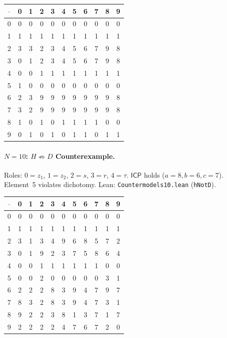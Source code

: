\documentclass[sigconf,screen]{acmart}
\newcommand{\dotop}{\cdot}
\newcommand{\ICP}{\textsf{ICP}}
\theoremstyle{remark}
\begin{document}
\medskip
{\footnotesize
\begin{tabular}{c|cccccccccc}
$\dotop$ & 0 & 1 & 2 & 3 & 4 & 5 & 6 & 7 & 8 & 9 \\\hline
0 & 0 & 0 & 0 & 0 & 0 & 0 & 0 & 0 & 0 & 0 \\
1 & 1 & 1 & 1 & 1 & 1 & 1 & 1 & 1 & 1 & 1 \\
2 & 3 & 3 & 2 & 3 & 4 & 5 & 6 & 7 & 9 & 8 \\
3 & 0 & 1 & 2 & 3 & 4 & 5 & 6 & 7 & 9 & 8 \\
4 & 0 & 0 & 1 & 1 & 1 & 1 & 1 & 1 & 1 & 1 \\
5 & 1 & 0 & 0 & 0 & 0 & 0 & 0 & 0 & 0 & 0 \\
6 & 2 & 3 & 9 & 9 & 9 & 9 & 9 & 9 & 9 & 8 \\
7 & 3 & 2 & 9 & 9 & 9 & 9 & 9 & 9 & 9 & 8 \\
8 & 1 & 0 & 1 & 0 & 1 & 1 & 1 & 1 & 0 & 0 \\
9 & 0 & 1 & 0 & 1 & 0 & 1 & 1 & 0 & 1 & 1 \\
\end{tabular}}

\paragraph{$N\!=\!10$: $H \not\Rightarrow D$ Counterexample.}
Roles: $0 = z_1$, $1 = z_2$, $2 = s$, $3 = r$, $4 = \tau$. $\ICP$ holds ($a\!=\!8, b\!=\!6, c\!=\!7$). Element~5 violates dichotomy. \quad Lean: \texttt{Countermodels10.lean} (\texttt{hNotD}).

\medskip
{\footnotesize
\begin{tabular}{c|cccccccccc}
$\dotop$ & 0 & 1 & 2 & 3 & 4 & 5 & 6 & 7 & 8 & 9 \\\hline
0 & 0 & 0 & 0 & 0 & 0 & 0 & 0 & 0 & 0 & 0 \\
1 & 1 & 1 & 1 & 1 & 1 & 1 & 1 & 1 & 1 & 1 \\
2 & 3 & 1 & 3 & 4 & 9 & 6 & 8 & 5 & 7 & 2 \\
3 & 0 & 1 & 9 & 2 & 3 & 7 & 5 & 8 & 6 & 4 \\
4 & 0 & 0 & 1 & 1 & 1 & 1 & 1 & 1 & 0 & 0 \\
5 & 0 & 0 & 2 & 0 & 0 & 0 & 0 & 0 & 3 & 1 \\
6 & 2 & 2 & 2 & 8 & 3 & 9 & 4 & 7 & 9 & 7 \\
7 & 8 & 3 & 2 & 8 & 3 & 9 & 4 & 7 & 3 & 1 \\
8 & 9 & 2 & 2 & 3 & 8 & 1 & 3 & 7 & 1 & 7 \\
9 & 2 & 2 & 2 & 2 & 4 & 7 & 6 & 7 & 2 & 0 \\
\end{tabular}}
\end{document}
